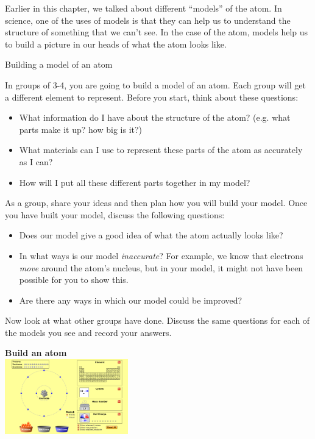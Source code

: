             \label{m38741*id260472}Earlier in this chapter, we talked about different ``models'' of the atom. In science, one of the uses of models is that they can help us to understand the structure of something that we can't see. In the case of the atom, models help us to build a picture in our heads of what the atom looks like. 
\pagebreak
\begin{groupdiscussion}{Building a model of an atom }
            \nopagebreak
\begin{multicols}{2}
        \label{m38741*id260488}In groups of 3-4, you are going to build a model of an atom. Each group will get a different element to represent. Before you start, think about these questions: 
        \label{m38741*id260495}\begin{itemize}[noitemsep]
            \label{m38741*uid114}\item What information do I have about the structure of the atom? (e.g.\@{} what parts make it up? how big is it?)
\label{m38741*uid115}\item What materials can I use to represent these parts of the atom as accurately as I can?
\label{m38741*uid116}\item How will I put all these different parts together in my model?
\end{itemize}
        \label{m38741*id260537}As a group, share your ideas and then plan how you will build your model. Once you have built your model, discuss the following questions: 
        \label{m38741*id260542}\begin{itemize}[noitemsep]
            \label{m38741*uid117}\item Does our model give a good idea of what the atom actually looks like?
\label{m38741*uid118}\item In what ways is our model \textsl{inaccurate}? For example, we know that electrons \textsl{move} around the atom's nucleus, but in your model, it might not have been possible for you to show this.
\label{m38741*uid119}\item Are there any ways in which our model could be improved?
\end{itemize}
        \label{m38741*id260596}Now look at what other groups have done. Discuss the same questions for each of the models you see and record your answers. 
\end{multicols}
\begin{center}
\textbf{Build an atom}\\
 \includegraphics[width=0.4\textwidth]{photos/BuildAtom.png}
\end{center}


\end{groupdiscussion}
